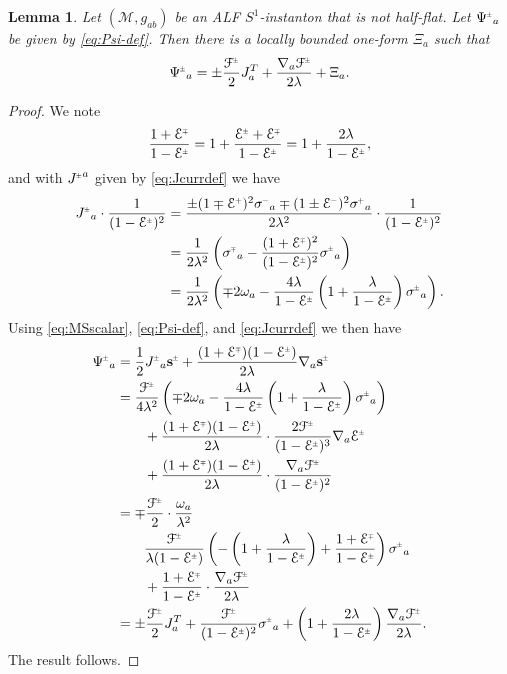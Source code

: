 \documentclass[a4paper,10pt,reqno]{amsart}
\newcommand{\cM}{\mathcal{M}}
\theoremstyle{plain}
\newtheorem{lemma}[thm]{Lemma}
\renewcommand{\P}[1]{{{#1}^{\hspace{-.5pt}\scaleto{+}{4pt}}}}
\newcommand{\M}[1]{{{#1}^{\hspace{-.5pt}\scaleto{-}{4pt}}}}
\newcommand{\PM}[1]{{{#1}^{\hspace{-.5pt}\scaleto{\pm}{3.5pt}}}}
\newcommand{\MP}[1]{{{#1}^{\hspace{-.5pt}\scaleto{\mp}{3.5pt}}}}
\def\Fcal{\mathcal{F}}
\def\Ecal{\mathcal{E}}
\def\sbold{\mathbf{s}}
\numberwithin{equation}{section}
\begin{document}
\begin{lemma} \label{lem:rewrite} 
Let $(\cM, g_{ab})$ be an ALF $S^1$-instanton that is not half-flat. Let $\PM{\Psi}_a$ be given by \eqref{eq:Psi-def}. Then there is a locally bounded one-form $\Xi_a$ such that  
\begin{align}
\PM{\Psi}_a 
= \pm \frac{\PM{\Fcal}}{2} J^T_a 
+ \frac{\nabla_a\PM{\Fcal}}{2\lambda} + \Xi_a .
\end{align} 
\end{lemma} 
\begin{proof}
We note 
\begin{align}
\frac{1 + \MP{\Ecal}}{1 - \PM{\Ecal}}
= 1 + \frac{\PM{\Ecal} + \MP{\Ecal}}{1 - \PM{\Ecal}} 
= 1 + \frac{2\lambda}{1 - \PM{\Ecal}}, 
\end{align}
and with $\PM{J}^a$ given by \eqref{eq:Jcurrdef} we have
\begin{align}
\PM{J}_{a} \cdot \frac{1}{(1 - \PM{\Ecal})^2}
&= 
\frac{\pm(1 \mp \P{\Ecal})^2 \M{\sigma}_{a} \mp (1 \pm \M{\Ecal})^2 \P{\sigma}_{a}}{2 \lambda^2} 
\cdot \frac{1}{(1 - \PM{\Ecal})^2}  \\
&= 
\frac{1}{2 \lambda^2} \left(
\MP{\sigma}_{a} - \frac{(1 + \MP{\Ecal})^2}{(1 - \PM{\Ecal})^2} \PM{\sigma}_{a} 
\right)  \\
&=
\frac{1}{2 \lambda^2} \left(
\mp 2\omega_a - \frac{4\lambda}{1 - \PM{\Ecal}} 
\left( 1 + \frac{\lambda}{1 - \PM{\Ecal}} \right)  \PM{\sigma}_{a}
\right).
\end{align}
Using \eqref{eq:MSscalar}, \eqref{eq:Psi-def}, and \eqref{eq:Jcurrdef} we then have
\begin{align}
\PM{\Psi}_a
&= 
\frac{1}{2} \PM{J}_a \PM{\sbold}
+ \frac{(1 + \MP{\Ecal}) (1 -  \PM{\Ecal})}{2\lambda} \nabla_a \PM{\sbold} \\
&=
\frac{\PM{\Fcal}}{4 \lambda^2} \left(
\mp 2\omega_a 
- \frac{4\lambda}{1 - \PM{\Ecal}} \left( 1 + \frac{\lambda}{1 - \PM{\Ecal}} \right) \PM{\sigma}_{a}
\right) \\
&\qquad 
+ \frac{(1+\MP{\Ecal}) (1-\PM{\Ecal})}{2\lambda} \cdot \frac{2\PM{\Fcal}}{(1-\PM{\Ecal})^3} \nabla_a \PM{\Ecal} \\
&\qquad 
+ \frac{(1+\MP{\Ecal}) (1-\PM{\Ecal})}{2\lambda} \cdot \frac{\nabla_a \PM{\Fcal}}{(1 -  \PM{\Ecal})^2} \\
&= 
\mp\frac{\PM{\Fcal}}{2} \cdot \frac{\omega_a}{\lambda^2} \\
&\qquad
\frac{\PM{\Fcal}}{\lambda(1-\PM{\Ecal})} 
\left(
- \left( 1 + \frac{\lambda}{1 - \PM{\Ecal}} \right) 
+ \frac{1 + \MP{\Ecal}}{1-\PM{\Ecal}} 
\right) \PM{\sigma}_{a} \\
&\qquad 
+ \frac{1 + \MP{\Ecal}}{1 -  \PM{\Ecal}} \cdot \frac{\nabla_a\PM{\Fcal}}{2\lambda} \\
&= 
\pm\frac{\PM{\Fcal}}{2} J^T_a 
+ \frac{\PM{\Fcal}}{(1-\PM{\Ecal})^2} \PM{\sigma}_{a} 
+ \left( 1 + \frac{2\lambda}{1 - \PM{\Ecal}}\right) \frac{\nabla_a\PM{\Fcal}}{2\lambda}. 
\end{align}
The result follows. 
\end{proof} 
\end{document}

